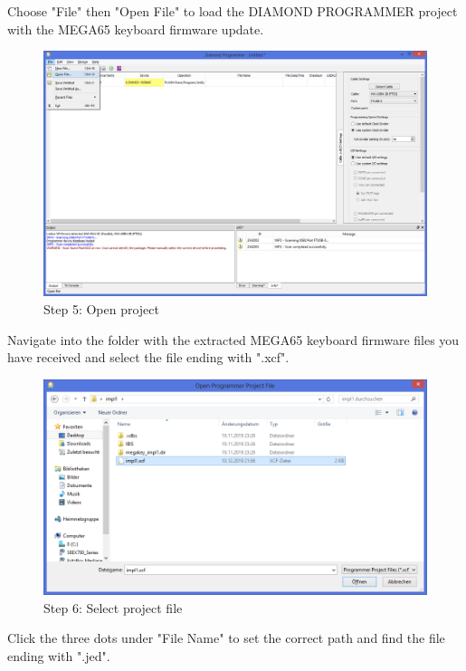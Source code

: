 Choose "File"  then "Open File" to load the DIAMOND PROGRAMMER project with the MEGA65 keyboard firmware update.

\begin{figure}
  \includegraphics[width=\linewidth]{images/diamond05.png}
  \caption{Step 5: Open project}
  \label{fig:diamond05}
\end{figure}

Navigate into the folder with the extracted MEGA65 keyboard firmware files you have received and select the file ending with ".xcf".

\begin{figure}
  \includegraphics[width=\linewidth]{images/diamond06.png}
  \caption{Step 6: Select project file}
  \label{fig:diamond06}
\end{figure}

Click the three dots under "File Name" to set the correct path and find the file ending with ".jed".

